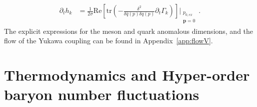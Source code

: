 \documentclass[%
reprint,
superscriptaddress,
showpacs,preprintnumbers,
 amsmath,amssymb,
 aps,
prd,
]{revtex4-1}
\def\app#1{Appendix~\ref{#1}}
\begin{document}
%
\begin{align}
  \partial_t h_k&=\frac{1}{2 \sigma}\mathrm{Re}\left[\mathrm{tr}\left(-\frac{\delta^2}{\delta\bar{q}(p)
            \delta q(p)}\partial_t \Gamma_k\right)\right]\Bigg|_{\substack{p_{0,ex}\\ \bm{p}=0}}\,.  \label{eq:dth}
\end{align}
%
The explicit expressions for the meson and quark anomalous dimensions, and the flow of the Yukawa coupling can be found in \app{app:flowV}.


\section{Thermodynamics and Hyper-order baryon number fluctuations}
\label{sec:hyper-fluc}
\end{document}
